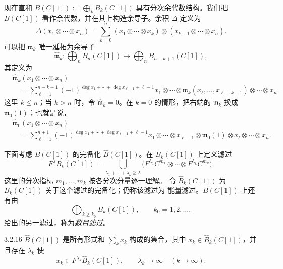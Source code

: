 现在直和 $B(C[1]):=\bigoplus_kB_k(C[1])$ 具有分次余代数结构。我们把
$B(C[1])$ 看作余代数，并在其上构造余导子。余积 $\Delta$ 定义为
\begin{equation}
  \Delta(x_1\otimes\cdots\otimes x_n)
  =\sum_{k=0}^{n}
  (x_1\otimes\cdots\otimes x_k)
  \otimes(x_{k+1}\otimes\cdots\otimes x_n).
  \tag{3.2.14}\label{eq:3-2-14}
\end{equation}
可以把 $\mathfrak m_k$ 唯一延拓为余导子
\[
  \widehat{\mathfrak m}_k\colon
  \bigoplus_nB_n(C[1])
  \longrightarrow
  \bigoplus_nB_{n-k+1}(C[1]),
\]
其定义为
\begin{equation}
\begin{aligned}
  &\widehat{\mathfrak m}_k(x_1\otimes\cdots\otimes x_n)\\
  &\quad={}
  \sum_{\ell=1}^{n-k+1}
  (-1)^{\deg x_1+\cdots+\deg x_{\ell-1}+\ell-1}
  x_1\otimes\cdots\otimes
  \mathfrak m_k(x_\ell,\ldots,x_{\ell+k-1})
  \otimes\cdots\otimes x_n .
\end{aligned}
\tag{3.2.15}\label{eq:3-2-15}
\end{equation}
这里 $k\leq n$；当 $k>n$ 时，令 $\widehat{\mathfrak m}_k=0$。在
$k=0$ 的情形，把右端的 $\mathfrak m_k$ 换成 $\mathfrak m_0(1)$；也就是说，
\[
\begin{aligned}
  &\widehat{\mathfrak m}_0(x_1\otimes\cdots\otimes x_n)\\
  &\quad={}
  \sum_{\ell=1}^{n+1}
  (-1)^{\deg x_1+\cdots+\deg x_{\ell-1}+\ell-1}
  x_1\otimes\cdots\otimes x_{\ell-1}\otimes
  \mathfrak m_0(1)\otimes x_\ell\otimes\cdots\otimes x_n.
\end{aligned}
\]

下面考虑 $B(C[1])$ 的完备化 $\widehat B(C[1])$。在 $B_k(C[1])$ 上定义滤过
\[
  F^\lambda B_k(C[1])
  =\bigcup_{\lambda_1+\cdots+\lambda_k\geq\lambda}
  \bigl(F^{\lambda_1}C^{m_1}\otimes\cdots\otimes
  F^{\lambda_k}C^{m_k}\bigr).
\]
这里的分次指标 $m_1,\ldots,m_k$ 按各分次分量逐一理解。
令 $\widehat B_k(C[1])$ 为 $B_k(C[1])$ 关于这个滤过的完备化；仍称该滤过为
能量滤过。$B(C[1])$ 上还有由
\[
  \bigoplus_{k\geq k_0}B_k(C[1]),
  \qquad k_0=1,2,\ldots,
\]
给出的另一滤过，称为\emph{数目滤过}。

\begin{definition}{3.2.16}\label{def:3-2-16}
$\widehat B(C[1])$ 是所有形式和 $\sum_kx_k$ 构成的集合，其中
$x_k\in\widehat B_k(C[1])$，并且存在 $\lambda_k$ 使
\[
  x_k\in F^{\lambda_k}\widehat B_k(C[1]),
  \qquad \lambda_k\longrightarrow\infty\quad(k\longrightarrow\infty).
\]
\end{definition}

